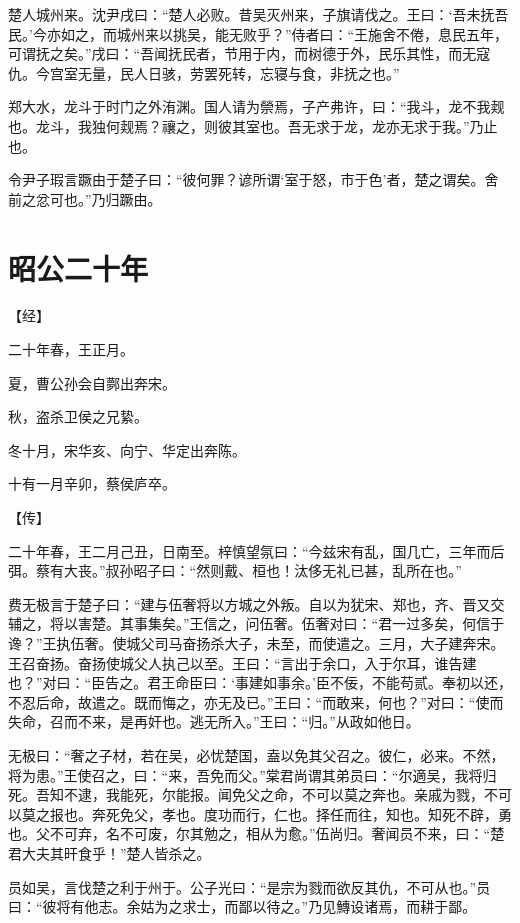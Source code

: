 \documentclass[a4paper,12pt,UTF8,twoside]{ctexbook}
\begin{document}
楚人城州来。沈尹戌曰：“楚人必败。昔吴灭州来，子旗请伐之。王曰：‘吾未抚吾民。’今亦如之，而城州来以挑吴，能无败乎？”侍者曰：“王施舍不倦，息民五年，可谓抚之矣。”戌曰：“吾闻抚民者，节用于内，而树德于外，民乐其性，而无寇仇。今宫室无量，民人日骇，劳罢死转，忘寝与食，非抚之也。”

郑大水，龙斗于时门之外洧渊。国人请为禜焉，子产弗许，曰：“我斗，龙不我觌也。龙斗，我独何觌焉？禳之，则彼其室也。吾无求于龙，龙亦无求于我。”乃止也。

令尹子瑕言蹶由于楚子曰：“彼何罪？谚所谓‘室于怒，市于色’者，楚之谓矣。舍前之忿可也。”乃归蹶由。


\section{昭公二十年}



【经】

二十年春，王正月。

夏，曹公孙会自鄸出奔宋。

秋，盗杀卫侯之兄絷。

冬十月，宋华亥、向宁、华定出奔陈。

十有一月辛卯，蔡侯庐卒。

【传】

二十年春，王二月己丑，日南至。梓慎望氛曰：“今兹宋有乱，国几亡，三年而后弭。蔡有大丧。”叔孙昭子曰：“然则戴、桓也！汰侈无礼已甚，乱所在也。”

费无极言于楚子曰：“建与伍奢将以方城之外叛。自以为犹宋、郑也，齐、晋又交辅之，将以害楚。其事集矣。”王信之，问伍奢。伍奢对曰：“君一过多矣，何信于谗？”王执伍奢。使城父司马奋扬杀大子，未至，而使遣之。三月，大子建奔宋。王召奋扬。奋扬使城父人执己以至。王曰：“言出于余口，入于尔耳，谁告建也？”对曰：“臣告之。君王命臣曰：‘事建如事余。’臣不佞，不能苟贰。奉初以还，不忍后命，故遣之。既而悔之，亦无及已。”王曰：“而敢来，何也？”对曰：“使而失命，召而不来，是再奸也。逃无所入。”王曰：“归。”从政如他日。

无极曰：“奢之子材，若在吴，必忧楚国，盍以免其父召之。彼仁，必来。不然，将为患。”王使召之，曰：“来，吾免而父。”棠君尚谓其弟员曰：“尔適吴，我将归死。吾知不逮，我能死，尔能报。闻免父之命，不可以莫之奔也。亲戚为戮，不可以莫之报也。奔死免父，孝也。度功而行，仁也。择任而往，知也。知死不辟，勇也。父不可弃，名不可废，尔其勉之，相从为愈。”伍尚归。奢闻员不来，曰：“楚君大夫其旰食乎！”楚人皆杀之。

员如吴，言伐楚之利于州于。公子光曰：“是宗为戮而欲反其仇，不可从也。”员曰：“彼将有他志。余姑为之求士，而鄙以待之。”乃见鱄设诸焉，而耕于鄙。
\end{document}

